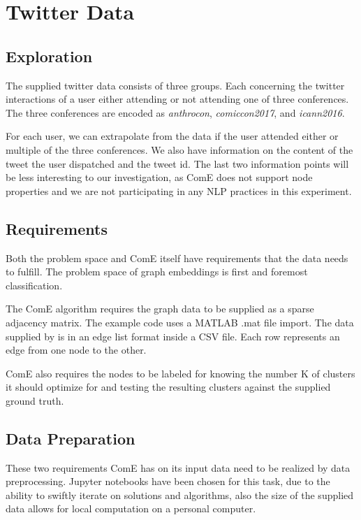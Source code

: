 \documentclass[sigconf, anonymous]{acmart}
\begin{document}
\section{Twitter Data}

\subsection{Exploration}

The supplied twitter data consists of three groups. Each concerning the twitter interactions of a user either attending or not attending one of three conferences. The three conferences are encoded as \textit{anthrocon}, \textit{comiccon2017}, and \textit{icann2016}.

For each user, we can extrapolate from the data if the user attended either or multiple of the three conferences. We also have information on the content of the tweet the user dispatched and the tweet id. The last two information points will be less interesting to our investigation, as ComE does not support node properties and we are not participating in any NLP practices in this experiment.

\subsection{Requirements}

Both the problem space and ComE itself have requirements that the data needs to fulfill. The problem space of graph embeddings is first and foremost classification.

The ComE algorithm requires the graph data to be supplied as a sparse adjacency matrix. The example code uses a MATLAB .mat file import. The data supplied by \citeauthor{TwitterData} is in an edge list format inside a CSV file. Each row represents an edge from one node to the other.

ComE also requires the nodes to be labeled for knowing the number K of clusters it should optimize for and testing the resulting clusters against the supplied ground truth.

\subsection{Data Preparation}

These two requirements ComE has on its input data need to be realized by data preprocessing. Jupyter notebooks have been chosen for this task, due to the ability to swiftly iterate on solutions and algorithms, also the size of the supplied data allows for local computation on a personal computer.
\end{document}
